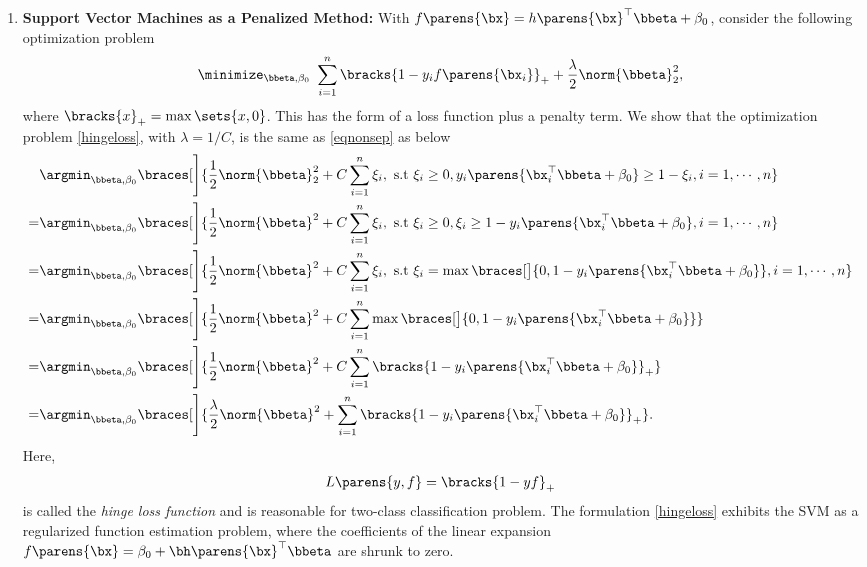 \documentclass[12pt]{article}
\begin{document}
\begin{enumerate}[label=\textbf{\arabic*.}]
	\item \textbf{Support Vector Machines as a Penalized Method:} With $f \parens{\bx} = h \parens{\bx}^\top \bbeta + \beta_0$, consider the following optimization problem 
	\begin{equation}\label{hingeloss}
		\minimize_{\bbeta, \beta_0} \ \sum_{i=1}^n \bracks{ 1 - y_i f \parens{\bx_i}}_+ + \frac{\lambda}{2} \norm{\bbeta}_2^2, 
	\end{equation}
	where $\bracks{x}_+ = \max \sets{x, 0}$. This has the form of a loss function plus a penalty term. We show that the optimization problem \eqref{hingeloss}, with $\lambda = 1/C$, is the same as \eqref{eqnonsep} as below 
	\begin{align*}
		& \argmin_{\bbeta, \beta_0} \braces[\Bigg]{\frac{1}{2} \norm{\bbeta}_2^2 + C \sum_{i=1}^n \xi_i, \text{ s.t } \xi_i \ge 0, y_i \parens{\bx_i^\top \bbeta + \beta_0} \ge 1 - \xi_i, i = 1, \cdots, n} \\ 
		= & \argmin_{\bbeta, \beta_0} \braces[\Bigg]{\frac{1}{2} \norm{\bbeta}^2 + C \sum_{i=1}^n \xi_i, \text{ s.t } \xi_i \ge 0, \xi_i \ge 1 - y_i \parens{\bx_i^\top \bbeta + \beta_0}, i = 1, \cdots, n} \\ 
		= & \argmin_{\bbeta, \beta_0} \braces[\Bigg]{\frac{1}{2} \norm{\bbeta}^2 + C\sum_{i=1}^n \xi_i, \text{ s.t } \xi_i = \max \braces[\big]{0, 1 - y_i \parens{\bx_i^\top \bbeta + \beta_0}}, i = 1, \cdots, n} \\ 
		= & \argmin_{\bbeta, \beta_0} \braces[\Bigg]{\frac{1}{2} \norm{\bbeta}^2 + C\sum_{i=1}^n \max \braces[\big]{0, 1 - y_i \parens{\bx_i^\top \bbeta + \beta_0}}} \\ 
		= & \argmin_{\bbeta, \beta_0} \braces[\Bigg]{\frac{1}{2} \norm{\bbeta}^2 + C\sum_{i=1}^n \bracks{ 1 - y_i \parens{\bx_i^\top \bbeta + \beta_0}}_+ } \\ 
		= & \argmin_{\bbeta, \beta_0} \braces[\Bigg]{\frac{\lambda}{2} \norm{\bbeta}^2 + \sum_{i=1}^n \bracks{ 1 - y_i \parens{ \bx_i^\top \bbeta + \beta_0}}_+ }. 
	\end{align*}
	Here, 
	\begin{align*}
		L \parens{y, f} = \bracks{1 - yf}_+
	\end{align*}
	is called the \textit{hinge loss function} and is reasonable for two-class classification problem. The formulation \eqref{hingeloss} exhibits the SVM as a regularized function estimation problem, where the coefficients of the linear expansion $f \parens{\bx} = \beta_0 + \bh \parens{\bx}^\top \bbeta $ are shrunk to zero. 
	

\end{enumerate}
\end{document}
